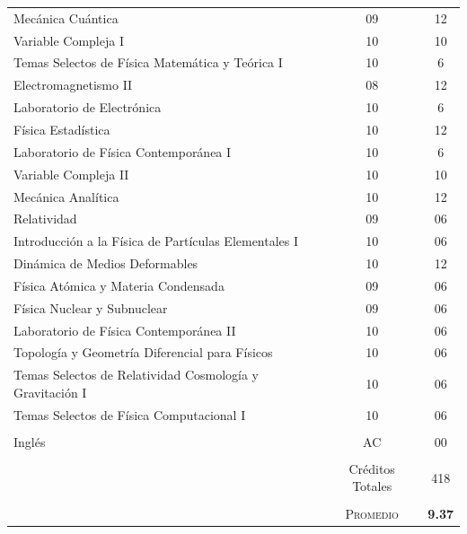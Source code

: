 \documentclass[a4paper,10pt]{article} %
\begin{document}
\begin{center}
\begin{tabular}{lcc}
Mecánica Cuántica & 09 & 12\\
Variable Compleja I & 10 & 10\\
Temas Selectos de Física Matemática y Teórica I & 10 & 6\\
Electromagnetismo II & 08 & 12\\
Laboratorio de Electrónica & 10 & 6\\
Física Estadística & 10 &12\\
Laboratorio de Física Contemporánea I & 10 & 6\\
Variable Compleja II & 10 & 10\\
Mecánica Analítica & 10 & 12\\
Relatividad & 09 & 06\\
Introducción a la Física de Partículas Elementales I & 10 & 06\\
Dinámica de Medios Deformables & 10 & 12\\
Física Atómica y Materia Condensada & 09 & 06\\
Física Nuclear y Subnuclear & 09 & 06\\
Laboratorio de Física Contemporánea II & 10 & 06\\
Topología y Geometría Diferencial para Físicos & 10 & 06\\
Temas Selectos de Relatividad Cosmología y Gravitación I & 10 & 06\\
Temas Selectos de Física Computacional I & 10 & 06\\ \\
Inglés & AC &	00\\ \\
& Créditos Totales & 418\\ \\
&\textsc{Promedio}&\textbf{9.37}
\end{tabular}
\end{center}
\vspace{5cm}

\end{document}
